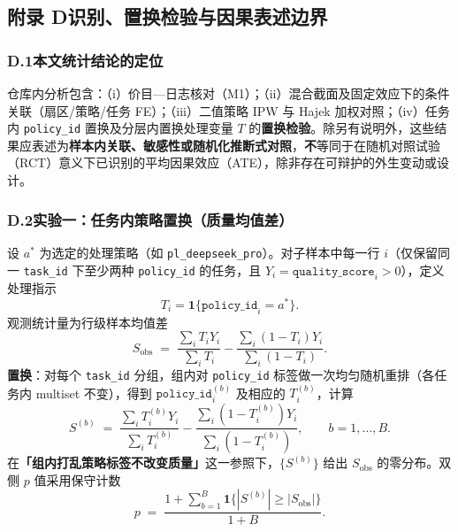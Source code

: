 
\subsection{附录 D\quad 识别、置换检验与因果表述边界}

\subsubsection{D.1\quad 本文统计结论的定位}

仓库内分析包含：（i）价目—日志核对（M1）；（ii）混合截面及固定效应下的条件关联（扇区/策略/任务 FE）；（iii）二值策略 IPW 与 Hajek 加权对照；（iv）任务内 \texttt{policy\_id} 置换及分层内置换处理变量 \(T\) 的\textbf{置换检验}。除另有说明外，这些结果应表述为\textbf{样本内关联、敏感性或随机化推断式对照}，\textbf{不}等同于在随机对照试验（RCT）意义下已识别的平均因果效应（ATE），除非存在可辩护的外生变动或设计。

\subsubsection{D.2\quad 实验一：任务内策略置换（质量均值差）}

设 \(a^\ast\) 为选定的处理策略（如 \texttt{pl\_deepseek\_pro}）。对子样本中每一行 \(i\)（仅保留同一 \texttt{task\_id} 下至少两种 \texttt{policy\_id} 的任务，且 \(Y_i=\texttt{quality\_score}_i>0\)），定义处理指示
\begin{equation}
T_i = \mathbf{1}\{\texttt{policy\_id}_i = a^\ast\}.
\end{equation}
观测统计量为行级样本均值差
\begin{equation}
S_{\mathrm{obs}} \;=\; \frac{\sum_i T_i Y_i}{\sum_i T_i} - \frac{\sum_i (1-T_i)Y_i}{\sum_i (1-T_i)}.
\end{equation}
\textbf{置换}：对每个 \texttt{task\_id} 分组，组内对 \texttt{policy\_id} 标签做一次均匀随机重排（各任务内 multiset 不变），得到 \(\texttt{policy\_id}_i^{(b)}\) 及相应的 \(T_i^{(b)}\)，计算
\begin{equation}
S^{(b)} \;=\; \frac{\sum_i T_i^{(b)} Y_i}{\sum_i T_i^{(b)}} - \frac{\sum_i (1-T_i^{(b)})Y_i}{\sum_i (1-T_i^{(b)})},\qquad b=1,\ldots,B.
\end{equation}
在\textbf{「组内打乱策略标签不改变质量」}这一参照下，\(\{S^{(b)}\}\) 给出 \(S_{\mathrm{obs}}\) 的零分布。双侧 \(p\) 值采用保守计数
\begin{equation}
p \;=\; \frac{1 + \sum_{b=1}^{B} \mathbf{1}\bigl\{|S^{(b)}| \ge |S_{\mathrm{obs}}|\bigr\}}{1 + B}.
\end{equation}

